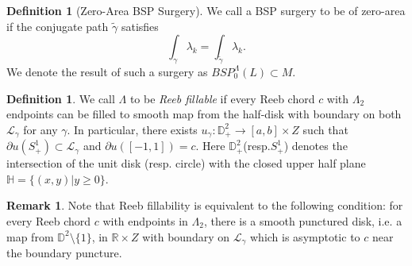 \documentclass[11pt, oneside,dvipsnames]{amsart}
\renewcommand{\to}{\rightarrow}
\newcommand{\sub}{\subset}
\newcommand{\wt}{\widetilde}
\renewcommand{\to}{\rightarrow}
\newcommand{\<}{\langle}
\renewcommand{\>}{\rangle}
\newcommand{\bD}{\mathbb{D}}
\newcommand{\bH}{\mathbb{H}}
\newcommand{\bR}{\mathbb{R}}
\newcommand{\cL}{\mathcal{L}}
\newcommand{\sm}{\ensuremath{\setminus}}
\renewcommand{\to}{\rightarrow}
\theoremstyle{definition}
\theoremstyle{definition}
\newtheorem{remark}[Theorem]{Remark}
\newtheorem{defn}[Theorem]{Definition}
\numberwithin{equation}{subsection}
\begin{document}
        


\begin{defn} [Zero-Area BSP Surgery] \label{def:zeroarea}
    We call a BSP surgery to be of zero-area if the conjugate path $\wt \gamma$ satisfies
    \begin{equation}\label{eq:zeroar}        \int_\gamma \lambda_k = \int_{\wt \gamma} \lambda_k.
    \end{equation}
    We denote the result of such a surgery as $BSP^{\Lambda}_0 (L) \subset M.$
\end{defn}

\begin{defn}\label{def:reebfill}
    We call $\Lambda$ to be \textit{Reeb fillable} if every Reeb chord $c$ with $\Lambda_2$ endpoints can be filled to smooth map from  the half-disk with boundary on both $\cL_\gamma$ for any $\gamma$. In particular, there exists $u_\gamma:\bD^2_+ \to [a,b] \times Z$ such that $\partial u ( S^1_+) \sub \cL_\gamma$ and $\partial u([-1,1])=c$. Here $\bD^2_+$(resp.$ S^1_+$) denotes the intersection of the unit disk (resp. circle) with the closed upper half plane $\bH = \{ (x,y) | y\geq 0\}.$ 
\end{defn}
\begin{remark}
     Note that Reeb fillability is equivalent to the following condition: for every Reeb chord $c$ with endpoints in $\Lambda_2$, there is a smooth punctured disk, i.e. a map from $\bD^2 \sm \{ 1\}$, in $\bR \times Z$ with boundary on $\cL_\gamma$ which is asymptotic to $c$ near the boundary puncture.
\end{remark}
\end{document}
